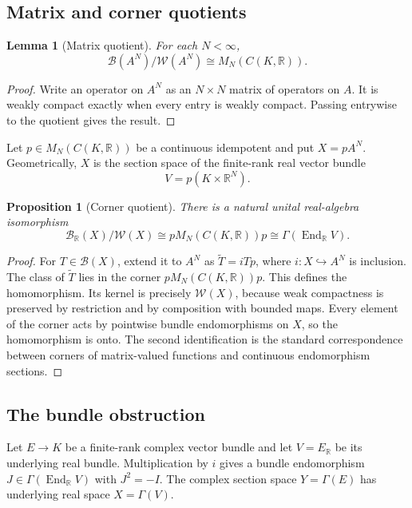 \documentclass[11pt]{article}
\newtheorem{proposition}[theorem]{Proposition}
\newtheorem{lemma}[theorem]{Lemma}
\theoremstyle{definition}
\theoremstyle{remark}
\newcommand{\R}{\mathbb R}
\newcommand{\cW}{\mathcal W}
\newcommand{\cB}{\mathcal B}
\newcommand{\End}{\operatorname{End}}
\begin{document}
\subsection{Matrix and corner quotients}

\begin{lemma}[Matrix quotient]\label{lem:matrix-quotient}
For each $N<\infty$,
\[
 \cB(A^N)/\cW(A^N)\cong M_N(C(K,\R)).
\]
\end{lemma}

\begin{proof}
Write an operator on $A^N$ as an $N\times N$ matrix of operators on $A$. It is weakly compact exactly when every entry is weakly compact. Passing entrywise to the quotient gives the result.
\end{proof}

Let $p\in M_N(C(K,\R))$ be a continuous idempotent and put $X=pA^N$. Geometrically, $X$ is the section space of the finite-rank real vector bundle
\[
       V=p(K\times\R^N).
\]

\begin{proposition}[Corner quotient]\label{prop:corner-quotient}
There is a natural unital real-algebra isomorphism
\[
 \cB_{\R}(X)/\cW(X)
     \cong pM_N(C(K,\R))p
     \cong \Gamma(\End_{\R}V).
\]
\end{proposition}

\begin{proof}
For $T\in\cB(X)$, extend it to $A^N$ as $\widetilde T=iTp$, where $i:X\hookrightarrow A^N$ is inclusion. The class of $\widetilde T$ lies in the corner $pM_N(C(K,\R))p$. This defines the homomorphism. Its kernel is precisely $\cW(X)$, because weak compactness is preserved by restriction and by composition with bounded maps. Every element of the corner acts by pointwise bundle endomorphisms on $X$, so the homomorphism is onto. The second identification is the standard correspondence between corners of matrix-valued functions and continuous endomorphism sections.
\end{proof}

\subsection{The bundle obstruction}

Let $E\to K$ be a finite-rank complex vector bundle and let $V=E_{\R}$ be its underlying real bundle. Multiplication by $i$ gives a bundle endomorphism $J\in\Gamma(\End_{\R}V)$ with $J^2=-I$. The complex section space $Y=\Gamma(E)$ has underlying real space $X=\Gamma(V)$.
\end{document}
